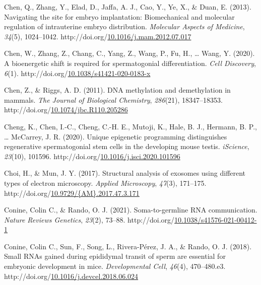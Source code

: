 \documentclass[12pt,twoside]{reedthesis}
\newlength{\cslhangindent}
\newenvironment{CSLReferences}[2] %
 {%
  \setlength{\parindent}{0pt}
  \ifodd #1 \everypar{\setlength{\hangindent}{\cslhangindent}}\ignorespaces\fi
  \ifnum #2 > 0
  \setlength{\parskip}{#2\baselineskip}
  \fi
 }%
 {}
\begin{document}
\begin{CSLReferences}{1}{0}
\leavevmode{}%
Chen, Q., Zhang, Y., Elad, D., Jaffa, A. J., Cao, Y., Ye, X., \& Duan, E. (2013). Navigating the site for embryo implantation: Biomechanical and molecular regulation of intrauterine embryo distribution. \emph{Molecular Aspects of Medicine}, \emph{34}(5), 1024--1042. http://doi.org/\href{https://doi.org/10.1016/j.mam.2012.07.017}{10.1016/j.mam.2012.07.017}

\leavevmode{}%
Chen, W., Zhang, Z., Chang, C., Yang, Z., Wang, P., Fu, H., \ldots{} Wang, Y. (2020). A bioenergetic shift is required for spermatogonial differentiation. \emph{Cell Discovery}, \emph{6}(1). http://doi.org/\href{https://doi.org/10.1038/s41421-020-0183-x}{10.1038/s41421-020-0183-x}

\leavevmode{}%
Chen, Z., \& Riggs, A. D. (2011). DNA methylation and demethylation in mammals. \emph{The Journal of Biological Chemistry}, \emph{286}(21), 18347--18353. http://doi.org/\href{https://doi.org/10.1074/jbc.R110.205286}{10.1074/jbc.R110.205286}

\leavevmode{}%
Cheng, K., Chen, I.-C., Cheng, C.-H. E., Mutoji, K., Hale, B. J., Hermann, B. P., \ldots{} McCarrey, J. R. (2020). Unique epigenetic programming distinguishes regenerative spermatogonial stem cells in the developing mouse testis. \emph{iScience}, \emph{23}(10), 101596. http://doi.org/\href{https://doi.org/10.1016/j.isci.2020.101596}{10.1016/j.isci.2020.101596}

\leavevmode{}%
Choi, H., \& Mun, J. Y. (2017). Structural analysis of exosomes using different types of electron microscopy. \emph{Applied Microscopy}, \emph{47}(3), 171--175. http://doi.org/\href{https://doi.org/10.9729/\%7BAM\%7D.2017.47.3.171}{10.9729/\{AM\}.2017.47.3.171}

\leavevmode{}%
Conine, Colin C., \& Rando, O. J. (2021). Soma-to-germline RNA communication. \emph{Nature Reviews Genetics}, \emph{23}(2), 73--88. http://doi.org/\href{https://doi.org/10.1038/s41576-021-00412-1}{10.1038/s41576-021-00412-1}

\leavevmode{}%
Conine, Colin C., Sun, F., Song, L., Rivera-Pérez, J. A., \& Rando, O. J. (2018). Small {RNAs} gained during epididymal transit of sperm are essential for embryonic development in mice. \emph{Developmental Cell}, \emph{46}(4), 470--480.e3. http://doi.org/\href{https://doi.org/10.1016/j.devcel.2018.06.024}{10.1016/j.devcel.2018.06.024}


\end{CSLReferences}
\end{document}
